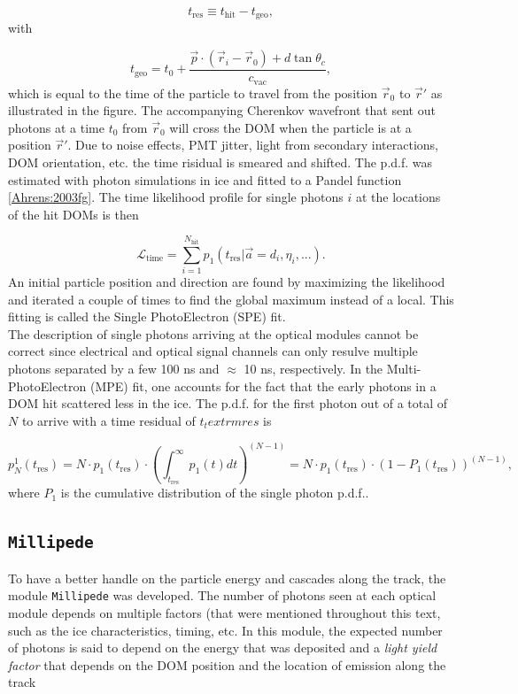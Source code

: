 \begin{equation}
t_{\textrm{res}} \equiv t_{\textrm{hit}} - t_{\textrm{geo}},
\end{equation}
\noindent with

\begin{equation}
t_\textrm{geo} = t_0 + \frac{\vec{p} \cdot (\vec{r}_i - \vec{r}_0) + d\tan \theta_c}{c_\textrm{vac}},
\end{equation}
\noindent which is equal to the time of the particle to travel from the position $\vec{r}_0$ to $\vec{r}'$ as illustrated in the figure. The accompanying Cherenkov wavefront that sent out photons at a time $t_0$ from $\vec{r}_0$ will cross the DOM when the particle is at a position $\vec{r}'$. Due to noise effects, PMT jitter, light from secondary interactions, DOM orientation, etc. the time risidual is smeared and shifted. The p.d.f. was estimated with photon simulations in ice and fitted to a Pandel function \ref{Ahrens:2003fg}. The time likelihood profile for single photons $i$ at the locations of the hit DOMs is then

\begin{equation}
\mathcal{L}_\textrm{time} = \sum^{N_\textrm{hit}}_{i=1} p_1 (t_\textrm{res} | \vec{a} = {d_i,\eta_i,...}).
\end{equation}
\noindent An initial particle position and direction are found by maximizing the likelihood and iterated a couple of times to find the global maximum instead of a local. This fitting is called the Single PhotoElectron (SPE) fit.\\

\noindent The description of single photons arriving at the optical modules cannot be correct since electrical and optical signal channels can only resulve multiple photons separated by a few 100 ns and $\approx$ 10 ns, respectively. In the Multi-PhotoElectron (MPE) fit, one accounts for the fact that the early photons in a DOM hit scattered less in the ice. The p.d.f. for the first photon out of a total of $N$ to arrive with a time residual of $t_textrm{res}$ is

\begin{equation}
p^1_N (t_\textrm{res}) = N \cdot p_1(t_\textrm{res}) \cdot \left(\int^\infty_{t_\textrm{res}} p_1(t) dt \right)^{(N-1)} = N \cdot p_1 (t_\textrm{res}) \cdot (1-P_1 (t_\textrm{res}))^{(N-1)},
\end{equation}
\noindent where $P_1$ is the cumulative distribution of the single photon p.d.f..
\subsection{\texttt{Millipede}}
To have a better handle on the particle energy and cascades along the track, the module \texttt{Millipede} was developed. The number of photons seen at each optical module depends on multiple factors (that were mentioned throughout this text, such as the ice characteristics, timing, etc. In this module, the expected number of photons is said to depend on the energy that was deposited and a \textit{light yield factor} that depends on the DOM position and the location of emission along the track

